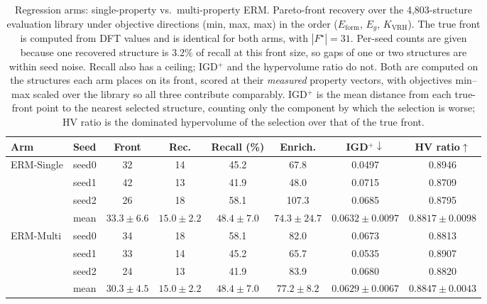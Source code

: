 \begin{table}[htbp]
\renewcommand{\arraystretch}{1.2}
\setlength{\tabcolsep}{4pt}
\caption{Regression arms: single-property vs.\ multi-property ERM. Pareto-front recovery over the 4{,}803-structure evaluation library under objective directions (min, max, max) in the order ($E_\mathrm{form}$, $E_g$, $K_\mathrm{VRH}$). The true front is computed from DFT values and is identical for both arms, with $|F^\star|{=}31$. Per-seed counts are given because one recovered structure is 3.2\% of recall at this front size, so gaps of one or two structures are within seed noise. Recall also has a ceiling; IGD$^+$ and the hypervolume ratio do not. Both are computed on the structures each arm places on its front, scored at their \emph{measured} property vectors, with objectives min--max scaled over the library so all three contribute comparably. IGD$^+$ is the mean distance from each true-front point to the nearest selected structure, counting only the component by which the selection is worse; HV ratio is the dominated hypervolume of the selection over that of the true front.}
\label{tab:pareto_arms_erm_heldout_min_max_max}
\centering
\footnotesize
\begin{tabular}{@{}llcccccc@{}}
\hline\hline
\textbf{Arm} & \textbf{Seed} & \textbf{Front} & \textbf{Rec.} & \textbf{Recall (\%)} & \textbf{Enrich.} & \textbf{IGD$^+\downarrow$} & \textbf{HV ratio$\uparrow$} \\
\hline
\multirow{4}{*}{ERM-Single}
  & seed0 & 32 & 14 & 45.2 & 67.8 & 0.0497 & 0.8946 \\
  & seed1 & 42 & 13 & 41.9 & 48.0 & 0.0715 & 0.8709 \\
  & seed2 & 26 & 18 & 58.1 & 107.3 & 0.0685 & 0.8795 \\
  & mean & $33.3 \pm 6.6$ & $15.0 \pm 2.2$ & $48.4 \pm 7.0$ & $74.3 \pm 24.7$ & $0.0632 \pm 0.0097$ & $0.8817 \pm 0.0098$ \\
\hline
\multirow{4}{*}{ERM-Multi}
  & seed0 & 34 & 18 & 58.1 & 82.0 & 0.0673 & 0.8813 \\
  & seed1 & 33 & 14 & 45.2 & 65.7 & 0.0535 & 0.8907 \\
  & seed2 & 24 & 13 & 41.9 & 83.9 & 0.0680 & 0.8820 \\
  & mean & $30.3 \pm 4.5$ & $15.0 \pm 2.2$ & $48.4 \pm 7.0$ & $77.2 \pm 8.2$ & $0.0629 \pm 0.0067$ & $0.8847 \pm 0.0043$ \\
\hline\hline
\end{tabular}
\end{table}
